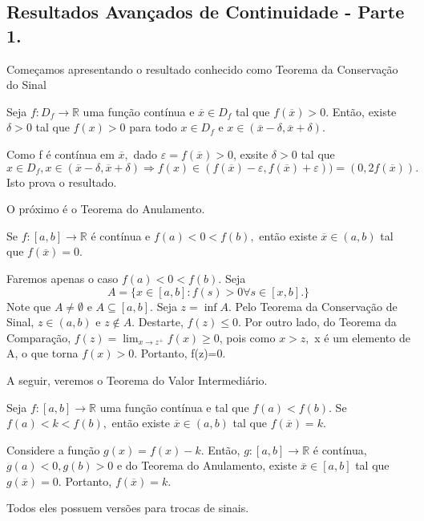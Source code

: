 \documentclass[Analysis/analysis_notes.tex]{subfiles}
\begin{document}
\subsection{Resultados Avan\c cados de Continuidade - Parte 1.}
Come\c camos apresentando o resultado conhecido como Teorema da Conserva\c c\~ao do Sinal
\begin{theorem*}
	Seja $f:D_{f}\rightarrow \mathbb{R}$ uma fun\c c\~ao cont\'inua e $\overline{x}\in D_{f}$ tal que $f(\overline{x})>0.$
	Ent\~ao, existe $\delta>0$ tal que $f(x)>0$ para todo $x\in D_{f}$ e $x\in(\overline{x}-\delta, \overline{x}+\delta).$
\end{theorem*}
\begin{proof*}
	Como f \'e cont\'inua em $\overline{x},$ dado $\varepsilon = f(\overline{x}) >0$, exsite $\delta > 0$ tal que
	$$
		x\in D_{f}, x\in(\overline{x}-\delta, \overline{x}+\delta) \Rightarrow f(x)\in (f(\overline{x})-\varepsilon, f(\overline{x})+\varepsilon)) =
		(0, 2f(\overline{x})).
	$$
	Isto prova o resultado. \qedsymbol
\end{proof*}
O pr\'oximo \'e o Teorema do Anulamento.
\begin{theorem*}
	Se $f:[a,b]\rightarrow \mathbb{R}$ \'e cont\'inua e $f(a)<0<f(b),$ ent\~ao existe $\overline{x}\in(a, b)$ tal que $f(\overline{x}) =0.$
\end{theorem*}
\begin{proof*}
	Faremos apenas o caso $f(a)<0<f(b).$ Seja
	$$
		A = \{x\in[a,b]:f(s)>0 \forall s\in[x, b].\}
	$$
	Note que $A\neq\emptyset$ e $A\subseteq{[a, b]}.$ Seja $z =\inf{A}$. Pelo Teorema da Conserva\c c\~ao de Sinal,
	$z\in(a, b)$ e $z\not\in A.$ Destarte, $f(z)\leq{0}.$ Por outro lado, do Teorema da Compara\c c\~ao, $f(z)=
		\lim_{x\to z^{+}}f(x)\geq{0}$, pois como $x > z,$ x \'e um elemento de A, o que torna $f(x)>0$. Portanto, f(z)=0.
\end{proof*}
A seguir, veremos o Teorema do Valor Intermedi\'ario.
\begin{theorem*}
	Seja $f:[a, b]\rightarrow \mathbb{R}$ uma fun\c c\~ao cont\'inua e tal que  $f(a)<f(b)$. Se $f(a)<k<f(b),$
	ent\~ao existe $\overline{x}\in(a, b)$ tal que $f(\overline{x})=k.$
\end{theorem*}
\begin{proof*}
	Considere a fun\c c\~ao $g(x)=f(x)-k.$ Ent\~ao, $g:[a, b]\rightarrow \mathbb{R}$ \'e cont\'inua, $g(a)<0, g(b)>0$
	e do Teorema do Anulamento, existe $\overline{x}\in[a, b]$ tal que $g(\overline{x})=0.$ Portanto, $f(\overline{x})=k.$\qedsymbol
\end{proof*}
Todos eles possuem vers\~oes para trocas de sinais.
\end{document}
